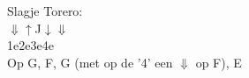 Slagje Torero:\\
$\Downarrow$\hspace{2em}$\uparrow$\hspace{2em}J\hspace{2em}$\downarrow$\hspace{2em}$\Downarrow$\hspace{2em}\hphantom{$\Downarrow$}\hspace{2em}\hphantom{$\Downarrow$}\hspace{2em}\\
1\hspace{2em}e\hspace{2em}2\hspace{2em}e\hspace{2em}3\hspace{2em}e\hspace{2em}4\hspace{2em}e\\
Op G, F, G (met op de '4' een $\Downarrow$ op F), E